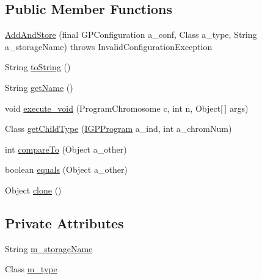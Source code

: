 \subsection*{Public Member Functions}
\begin{DoxyCompactItemize}
\item 
\hyperlink{classorg_1_1jgap_1_1gp_1_1function_1_1_add_and_store_af945cf220f74e250e8e85cfdb1d732ed}{Add\-And\-Store} (final G\-P\-Configuration a\-\_\-conf, Class a\-\_\-type, String a\-\_\-storage\-Name)  throws Invalid\-Configuration\-Exception 
\item 
String \hyperlink{classorg_1_1jgap_1_1gp_1_1function_1_1_add_and_store_a7e59b96566c171ff57b15447bfa24176}{to\-String} ()
\item 
String \hyperlink{classorg_1_1jgap_1_1gp_1_1function_1_1_add_and_store_aaadc7ed5e247750a7cbf7d87bcba6bd8}{get\-Name} ()
\item 
void \hyperlink{classorg_1_1jgap_1_1gp_1_1function_1_1_add_and_store_ad7eafe1504fb37c3631687ceda439aa3}{execute\-\_\-void} (Program\-Chromosome c, int n, Object\mbox{[}$\,$\mbox{]} args)
\item 
Class \hyperlink{classorg_1_1jgap_1_1gp_1_1function_1_1_add_and_store_ab12e6bc462f123511f21a6cfe25bb5fc}{get\-Child\-Type} (\hyperlink{interfaceorg_1_1jgap_1_1gp_1_1_i_g_p_program}{I\-G\-P\-Program} a\-\_\-ind, int a\-\_\-chrom\-Num)
\item 
int \hyperlink{classorg_1_1jgap_1_1gp_1_1function_1_1_add_and_store_a85981abb15fda93c1dedd77102482bc6}{compare\-To} (Object a\-\_\-other)
\item 
boolean \hyperlink{classorg_1_1jgap_1_1gp_1_1function_1_1_add_and_store_aa29cf343055f57008053066ccfb1a177}{equals} (Object a\-\_\-other)
\item 
Object \hyperlink{classorg_1_1jgap_1_1gp_1_1function_1_1_add_and_store_abd439c91466f1d3f2aed2752508a00d8}{clone} ()
\end{DoxyCompactItemize}
\subsection*{Private Attributes}
\begin{DoxyCompactItemize}
\item 
String \hyperlink{classorg_1_1jgap_1_1gp_1_1function_1_1_add_and_store_aaea25fb58b8f1efe56df91b0a37da642}{m\-\_\-storage\-Name}
\item 
Class \hyperlink{classorg_1_1jgap_1_1gp_1_1function_1_1_add_and_store_a01a50be6c8cc4fa4106878c9e7e618a0}{m\-\_\-type}
\end{DoxyCompactItemize}
